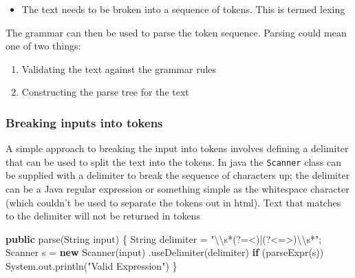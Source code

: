 \documentclass[
]{book}
\newenvironment{Shaded}{\begin{snugshade}}{\end{snugshade}}
\newcommand{\BuiltInTok}[1]{#1}
\newcommand{\FunctionTok}[1]{\textcolor[rgb]{0.00,0.00,0.00}{#1}}
\newcommand{\KeywordTok}[1]{\textcolor[rgb]{0.13,0.29,0.53}{\textbf{#1}}}
\newcommand{\NormalTok}[1]{#1}
\newcommand{\SpecialCharTok}[1]{\textcolor[rgb]{0.00,0.00,0.00}{#1}}
\newcommand{\StringTok}[1]{\textcolor[rgb]{0.31,0.60,0.02}{#1}}
\providecommand{\tightlist}{%
  \setlength{\itemsep}{0pt}\setlength{\parskip}{0pt}}
\begin{document}
\begin{itemize}
\tightlist
\item
  The text needs to be broken into a sequence of tokens. This is termed {lexing}
\end{itemize}

The grammar can then be used to parse the token sequence. Parsing could mean one of two things:

\begin{enumerate}
\def\labelenumi{\arabic{enumi}.}
\tightlist
\item
  Validating the text against the grammar rules
\item
  Constructing the parse tree for the text
\end{enumerate}

\hypertarget{breaking-inputs-into-tokens}{%
\subsubsection{Breaking inputs into tokens}\label{breaking-inputs-into-tokens}}

A simple approach to breaking the input into tokens involves defining a delimiter that can be used to split the text into the tokens. In java the \texttt{Scanner} class can be supplied with a delimiter to break the sequence of characters up; the delimiter can be a Java regular expression or something simple as the whitespace character (which couldn't be used to separate the tokens out in html). Text that matches to the delimiter will not be returned in tokens

\begin{Shaded}
\begin{Highlighting}[]
\KeywordTok{public} \FunctionTok{parse}\NormalTok{(}\BuiltInTok{String}\NormalTok{ input) \{}
  \BuiltInTok{String}\NormalTok{ delimiter = }\StringTok{"}\SpecialCharTok{\textbackslash{}\textbackslash{}}\StringTok{s*(?=\textless{})|(?\textless{}=\textgreater{})}\SpecialCharTok{\textbackslash{}\textbackslash{}}\StringTok{s*"}\NormalTok{;}
  \BuiltInTok{Scanner}\NormalTok{ s = }\KeywordTok{new} \BuiltInTok{Scanner}\NormalTok{(input)}
\NormalTok{    .}\FunctionTok{useDelimiter}\NormalTok{(delimiter)}
  \KeywordTok{if}\NormalTok{ (}\FunctionTok{parseExpr}\NormalTok{(s)) }
    \BuiltInTok{System}\NormalTok{.}\FunctionTok{out}\NormalTok{.}\FunctionTok{println}\NormalTok{(}\StringTok{"Valid Expression"}\NormalTok{)}
\NormalTok{\}}
\end{Highlighting}
\end{Shaded}
\end{document}
